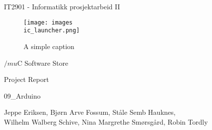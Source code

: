 \begin{titlepage}
\begin{center}
\vspace*{1in}
{\LARGE IT2901 - Informatikk prosjektarbeid II}
\par
\vspace{1in}


\begin{figure}[ht!]
\centering
\texttt{[image: images\\ic\_launcher.png]}
\caption{A simple caption}
\label{overflow}
\end{figure}


{\LARGE $/mu$C Software Store}
\par
\vspace{0.6in}
{\LARGE Project Report}
\par
\vspace{0.2in}
{\Large 09\_Arduino}
\par
\vfill
\par
\vspace{0.5in}
Jeppe Eriksen, Bjørn Arve Fossum, Ståle Semb Hauknes,\\ Wilhelm Walberg Schive, Nina Margrethe Smørsgård, Robin Tordly\\
\par
\end{center}
\end{titlepage}
